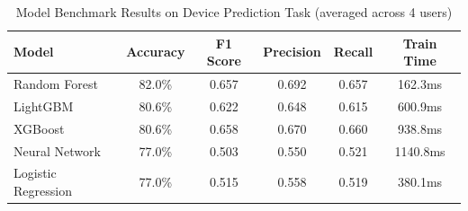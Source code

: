 
\begin{table}[H]
    \centering
    \caption{Model Benchmark Results on Device Prediction Task (averaged across 4 users)}
    \label{tab:model-benchmark}
    \renewcommand{\arraystretch}{1.3}
    \small
    \begin{tabular}{@{} l c c c c c @{}}
        \toprule
        \textbf{Model} & \textbf{Accuracy} & \textbf{F1 Score} & \textbf{Precision} & \textbf{Recall} & \textbf{Train Time} \\
        \midrule
        Random Forest & 82.0\% & 0.657 & 0.692 & 0.657 & 162.3ms \\
        LightGBM & 80.6\% & 0.622 & 0.648 & 0.615 & 600.9ms \\
        XGBoost & 80.6\% & 0.658 & 0.670 & 0.660 & 938.8ms \\
        Neural Network & 77.0\% & 0.503 & 0.550 & 0.521 & 1140.8ms \\
        Logistic Regression & 77.0\% & 0.515 & 0.558 & 0.519 & 380.1ms \\
        \bottomrule
    \end{tabular}
\end{table}
